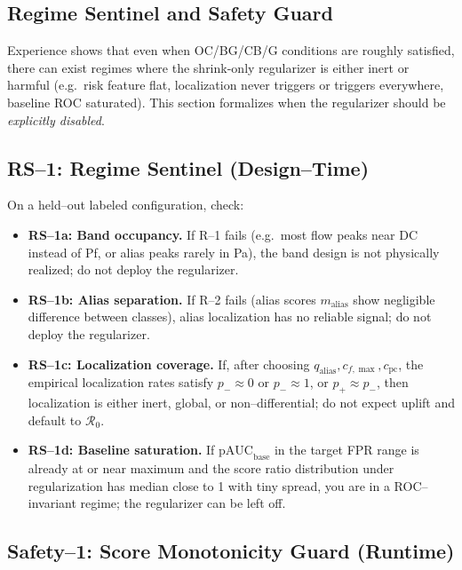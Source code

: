 \subsection{Regime Sentinel and Safety Guard}
\label{sec:regime-sentinel}

Experience shows that even when OC/BG/CB/G conditions are roughly satisfied, there can exist regimes where the shrink-only regularizer is either inert or harmful (e.g.\ risk feature flat, localization never triggers or triggers everywhere, baseline ROC saturated). This section formalizes when the regularizer should be \emph{explicitly disabled}.

\subsection{RS--1: Regime Sentinel (Design--Time)}

On a held--out labeled configuration, check:

\begin{itemize}[nosep]
  \item \textbf{RS--1a: Band occupancy.} If R--1 fails (e.g.\ most flow peaks near DC instead of Pf, or alias peaks rarely in Pa), the band design is not physically realized; do not deploy the regularizer.
  \item \textbf{RS--1b: Alias separation.} If R--2 fails (alias scores $m_{\text{alias}}$ show negligible difference between classes), alias localization has no reliable signal; do not deploy the regularizer.
  \item \textbf{RS--1c: Localization coverage.} If, after choosing $q_{\text{alias}},c_{f,\max},c_{\text{pc}}$, the empirical localization rates satisfy $p_-\approx 0$ or $p_-\approx 1$, or $p_+ \approx p_-$, then localization is either inert, global, or non--differential; do not expect uplift and default to $\mathcal{R}_0$.
  \item \textbf{RS--1d: Baseline saturation.} If $\text{pAUC}_\text{base}$ in the target FPR range is already at or near maximum and the score ratio distribution under regularization has median close to 1 with tiny spread, you are in a ROC--invariant regime; the regularizer can be left off.
\end{itemize}

\subsection{Safety--1: Score Monotonicity Guard (Runtime)}

